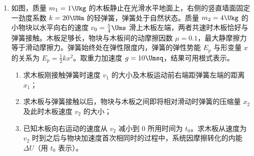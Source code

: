 \documentclass[\gkver]{gaokaozhenti}
\begin{document}
\begin{enumerate}
{\begin{enumerate}

	\item
	带电粒子在该磁场中运动的半径与圆形磁场半径关系为 $r = \sqrt{3}R$，根据几何关系可知，带电粒子在该磁场中运动的轨迹一定为劣弧，故劣弧所对应轨迹圆的弦为磁场圆的直径时粒子在磁场中运动的时间最长。则相对应的运动轨迹和弦以及圆心 M 的位置如图所示：

\end{enumerate}
}

\item
如图，质量 $m_{1}=1\Ukg$ 的木板静止在光滑水平地面上，右侧的竖直墙面固定一劲度系数 $k=20\UNm$ 的轻弹簧，弹簧处于自然状态。质量 $m_{2}=4\Ukg$ 的小物块以水平向右的速度 $v_{0}=\frac{5}{4}\Ums$ 滑上木板左端，两者共速时木板恰好与弹簧接触。木板足够长，物块与木板间的动摩擦因数 $\mu=0.1$，最大静摩擦力等于滑动摩擦力。弹簧始终处在弹性限度内，弹簧的弹性势能 $E_{p}$ 与形变量 $x$ 的关系为 $E_{p}=\frac{1}{2}kx^{2}$。取重力加速度 $g=10\Umsq$，结果可用根式表示。
\begin{enumerate}
	\item
	求木板刚接触弹簧时速度 $v_{1}$ 的大小及木板运动前右端距弹簧左端的距离 $x_{1}$；
	\item
	求木板与弹簧接触以后，物块与木板之间即将相对滑动时弹簧的压缩量 $x_{2}$ 及此时木板速度 $v_{2}$ 的大小；
	\item
	已知木板向右运动的速度从 $v_{2}$ 减小到 0 所用时间为 $t_{0}$。求木板从速度为 $v_{2}$ 时到之后与物块加速度首次相同时的过程中，系统因摩擦转化的内能 $\Delta U$（用 $t_{0}$ 表示）。
\end{enumerate}
\end{enumerate}
\end{document}
